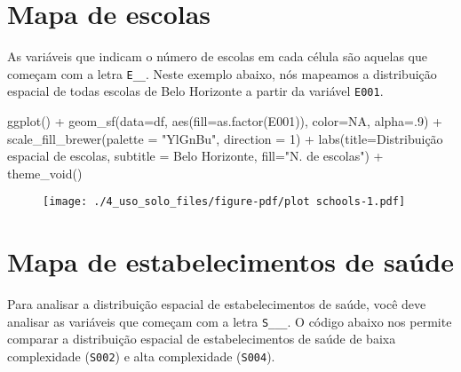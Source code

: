 \documentclass[
  letterpaper,
  DIV=11,
  numbers=noendperiod]{scrreprt}
\newenvironment{Shaded}{\begin{snugshade}}{\end{snugshade}}
\newcommand{\AttributeTok}[1]{\textcolor[rgb]{0.40,0.45,0.13}{#1}}
\newcommand{\ConstantTok}[1]{\textcolor[rgb]{0.56,0.35,0.01}{#1}}
\newcommand{\DecValTok}[1]{\textcolor[rgb]{0.68,0.00,0.00}{#1}}
\newcommand{\FunctionTok}[1]{\textcolor[rgb]{0.28,0.35,0.67}{#1}}
\newcommand{\NormalTok}[1]{\textcolor[rgb]{0.00,0.23,0.31}{#1}}
\newcommand{\SpecialCharTok}[1]{\textcolor[rgb]{0.37,0.37,0.37}{#1}}
\newcommand{\StringTok}[1]{\textcolor[rgb]{0.13,0.47,0.30}{#1}}
\begin{document}
\hypertarget{mapa-de-escolas}{%
\section{Mapa de escolas}\label{mapa-de-escolas}}

As variáveis que indicam o número de escolas em cada célula são aquelas
que começam com a letra \texttt{E\_\_}. Neste exemplo abaixo, nós
mapeamos a distribuição espacial de todas escolas de Belo Horizonte a
partir da variável \texttt{E001}.

\begin{Shaded}
\begin{Highlighting}[]
\FunctionTok{ggplot}\NormalTok{() }\SpecialCharTok{+}
  \FunctionTok{geom\_sf}\NormalTok{(}\AttributeTok{data=}\NormalTok{df, }\FunctionTok{aes}\NormalTok{(}\AttributeTok{fill=}\FunctionTok{as.factor}\NormalTok{(E001)), }\AttributeTok{color=}\ConstantTok{NA}\NormalTok{, }\AttributeTok{alpha=}\NormalTok{.}\DecValTok{9}\NormalTok{) }\SpecialCharTok{+}
   \FunctionTok{scale\_fill\_brewer}\NormalTok{(}\AttributeTok{palette =} \StringTok{"YlGnBu"}\NormalTok{, }\AttributeTok{direction =} \DecValTok{1}\NormalTok{) }\SpecialCharTok{+}
  \FunctionTok{labs}\NormalTok{(}\AttributeTok{title=}\StringTok{\textquotesingle{}Distribuição espacial de escolas\textquotesingle{}}\NormalTok{, }
       \AttributeTok{subtitle =} \StringTok{\textquotesingle{}Belo Horizonte\textquotesingle{}}\NormalTok{, }\AttributeTok{fill=}\StringTok{"N. de escolas"}\NormalTok{) }\SpecialCharTok{+}
  \FunctionTok{theme\_void}\NormalTok{()}
\end{Highlighting}
\end{Shaded}

\begin{figure}[H]

{\centering \texttt{[image: ./4\_uso\_solo\_files/figure-pdf/plot schools-1.pdf]}

}

\end{figure}

\hypertarget{mapa-de-estabelecimentos-de-sauxfade}{%
\section{Mapa de estabelecimentos de
saúde}\label{mapa-de-estabelecimentos-de-sauxfade}}

Para analisar a distribuição espacial de estabelecimentos de saúde, você
deve analisar as variáveis que começam com a letra \texttt{S\_\_\_}. O
código abaixo nos permite comparar a distribuição espacial de
estabelecimentos de saúde de baixa complexidade (\texttt{S002}) e alta
complexidade (\texttt{S004}).
\end{document}
